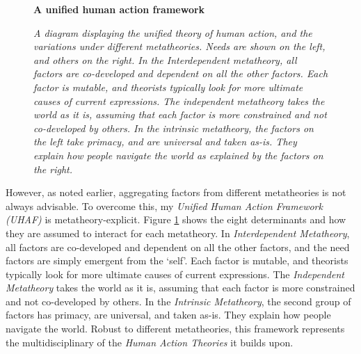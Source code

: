 \documentclass[12 pt]{article}
\begin{document}
   \begin{figure}
   	\centering
   	\textbf{A unified human action framework}\par \medskip
   	
   	\caption{\textit{A diagram displaying the unified theory of human action, and the variations under different metatheories. Needs are shown on the left, and others on the right. In the Interdependent metatheory, all factors are co-developed and dependent on all the other factors. Each factor is mutable, and theorists typically look for more ultimate causes of current expressions. The independent metatheory takes the world as it is, assuming that each factor is more constrained and not co-developed by others. In the intrinsic metatheory, the factors on the left take primacy, and are universal and taken as-is. They explain how people navigate the world as explained by the factors on the right.}}
   	\label{fig:unifidag}
   \end{figure}
   
 However, as noted earlier, aggregating factors from different metatheories is not always advisable. To overcome this, my \textit{Unified Human Action Framework (UHAF)} is metatheory-explicit. Figure \ref{fig:unifidag} shows the eight determinants and how they are assumed to interact for each metatheory. In \textit{Interdependent Metatheory}, all factors are co-developed and dependent on all the other factors, and the need factors are simply emergent from the `self'. Each factor is mutable, and theorists typically look for more ultimate causes of current expressions. The \textit{Independent Metatheory} takes the world as it is, assuming that each factor is more constrained and not co-developed by others. In the \textit{Intrinsic Metatheory}, the second group of factors has primacy, are universal, and taken as-is. They explain how people navigate the world.  Robust to different metatheories, this framework represents the multidisciplinary of the \textit{Human Action Theories} it builds upon.  
  
\end{document}
